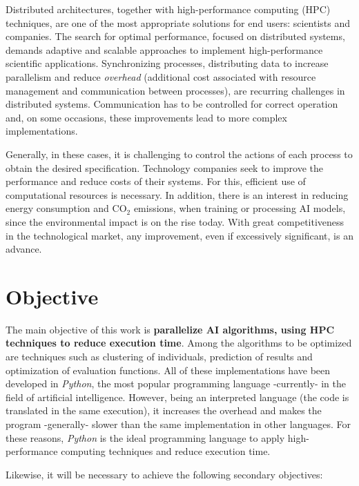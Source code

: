 Distributed architectures, together with high-performance computing (HPC) techniques, are one of the most appropriate solutions for end users: scientists and companies. The search for optimal performance, focused on distributed systems, demands adaptive and scalable approaches to implement high-performance scientific applications. Synchronizing processes, distributing data to increase parallelism and reduce \textit{overhead} (additional cost associated with resource management and communication between processes), are recurring challenges in distributed systems. Communication has to be controlled for correct operation and, on some occasions, these improvements lead to more complex implementations.

Generally, in these cases, it is challenging to control the actions of each process to obtain the desired specification. Technology companies seek to improve the performance and reduce costs of their systems. For this, efficient use of computational resources is necessary. In addition, there is an interest in reducing energy consumption and CO\(_2\) emissions, when training or processing AI models, since the environmental impact is on the rise today. With great competitiveness in the technological market, any improvement, even if excessively significant, is an advance.


\section{Objective}


The main objective of this work is \textbf{parallelize AI algorithms, using HPC techniques to reduce execution time}. Among the algorithms to be optimized are techniques such as clustering of individuals, prediction of results and optimization of evaluation functions. All of these implementations have been developed in \textit{Python}, the most popular programming language -currently- in the field of artificial intelligence\cite{sainin2021best}. However, being an interpreted language (the code is translated in the same execution), it increases the overhead and makes the program -generally- slower than the same implementation in other languages. For these reasons, \textit{Python} is the ideal programming language to apply high-performance computing techniques and reduce execution time.

Likewise, it will be necessary to achieve the following secondary objectives:

